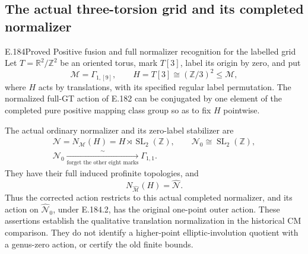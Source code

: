\subsection{The actual three-torsion grid and its completed normalizer}

\begin{result}{E.184}{Proved}
{Positive fusion and full normalizer recognition for the labelled grid}
Let \(T=\mathbb R^2/\mathbb Z^2\) be an oriented torus, mark
\(T[3]\), label its origin by zero, and put
\[
 \mathcal M=\Gamma_{1,[9]},\qquad
 H=T[3]\cong(\mathbb Z/3)^2\leq\mathcal M,
\tag{E.184.1}
\]
where \(H\) acts by translations, with its specified regular
label permutation.  The normalized full-GT action of E.182
can be conjugated by one element of the completed pure
positive mapping class group so as to fix \(H\) pointwise.

The actual ordinary normalizer and its zero-label stabilizer are
\[
 \begin{gathered}
 \mathcal N=N_{\mathcal M}(H)
       =H\rtimes\operatorname{SL}_2(\mathbb Z),\qquad
 \mathcal N_0\cong\operatorname{SL}_2(\mathbb Z),\\
 \mathcal N_0\xrightarrow[\text{forget the other eight marks}]{\sim}
                         \Gamma_{1,1}.
 \end{gathered}
\tag{E.184.2}
\]
They have their full induced profinite topologies, and
\[
                 N_{\widehat{\mathcal M}}(H)
                         =\widehat{\mathcal N}.
\tag{E.184.3}
\]
Thus the corrected action restricts to this actual completed
normalizer, and its action on \(\widehat{\mathcal N}_0\),
under E.184.2, has the original one-point outer action.
These assertions establish the qualitative translation
normalization in the historical CM comparison.  They do
not identify a higher-point elliptic-involution quotient
with a genus-zero action, or certify the old finite bounds.
\end{result}

